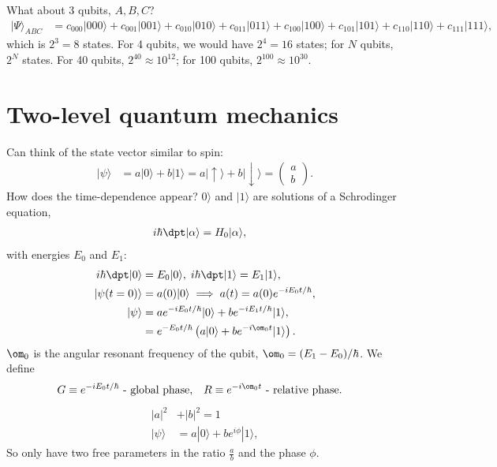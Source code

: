 \documentclass[lasers.tex]{subfiles}
\begin{document}
What about 3 qubits, $A,B,C$?
\begin{align}
    |\Psi\rangle_{ABC} &= c_{000}|000\rangle + c_{001}|001\rangle + c_{010}|010\rangle + c_{011}|011\rangle + c_{100}|100\rangle + c_{101}|101\rangle + c_{110}|110\rangle + c_{111}|111\rangle,
\end{align}
which is $2^3=8$ states. 
For 4 qubits, we would have $2^4=16$ states; for $N$ qubits, $2^N$ states. 
For 40 qubits, $2^{40}\approx10^{12}$; for 100 qubits, $2^{100}\approx10^{30}$.

\chapter{Two-level quantum mechanics}
Can think of the state vector similar to spin:
\begin{align}
    |\psi\rangle &= a|0\rangle + b|1\rangle = a|\uparrow\rangle + b|\downarrow\rangle = \begin{pmatrix} a \\ b\end{pmatrix}.
\end{align}
How does the time-dependence appear?
$0\rangle$ and $|1\rangle$ are solutions of a Schrodinger equation,
\begin{align}
    i\hbar\dpt|\alpha\rangle &= H_0|\alpha\rangle,
\end{align}
with energies $E_0$ and $E_1$:
\begin{align}
    i\hbar\dpt|0\rangle &= E_0|0\rangle,\; i\hbar\dpt|1\rangle = E_1|1\rangle, \\
    |\psi(t=0)\rangle &= a(0)|0\rangle \implies a(t) = a(0)e^{-iE_0t/\hbar},\\
    |\psi\rangle &= ae^{-iE_0t/\hbar}|0\rangle + be^{-iE_1t/\hbar}|1\rangle, \\
                 &= e^{-E_0t/\hbar}\left(a|0\rangle + be^{-i\om_0 t}|1\rangle\right).
\end{align}
$\om_0$ is the angular resonant frequency of the qubit, $\om_0=(E_1-E_0)/\hbar$.
We define
\begin{align}
    G &\equiv e^{-iE_0t/\hbar} \text{ - global phase}, & R &\equiv e^{-i\om_0t} \text{ - relative phase}.
\end{align}
\begin{align}
    |a|^2 &+ |b|^2 = 1 \\
    |\psi\rangle &= a|0\rangle + be^{i\phi}|1\rangle,
\end{align}
So only have two free parameters in the ratio $\frac{a}{b}$ and the phase $\phi$.
\end{document}
